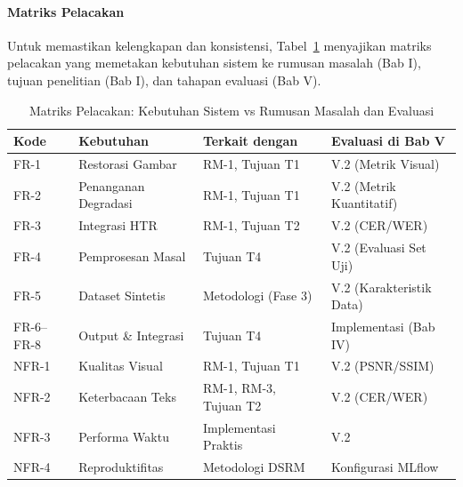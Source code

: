 \documentclass[12pt,a4paper]{article}
\begin{document}
\paragraph{Matriks Pelacakan}

Untuk memastikan kelengkapan dan konsistensi, Tabel~\ref{tab:traceability-matrix} menyajikan matriks pelacakan yang memetakan kebutuhan sistem ke rumusan masalah (Bab I), tujuan penelitian (Bab I), dan tahapan evaluasi (Bab V).

\begin{table}[htbp!]
\centering
\small
\caption{Matriks Pelacakan: Kebutuhan Sistem vs Rumusan Masalah dan Evaluasi}
\label{tab:traceability-matrix}
\begin{tabular}{p{}p{}p{}p{}}
\toprule
\textbf{Kode} & \textbf{Kebutuhan} & \textbf{Terkait dengan} & \textbf{Evaluasi di Bab V} \\
\midrule
FR-1 & Restorasi Gambar & RM-1, Tujuan T1 & V.2 (Metrik Visual) \\
\midrule
FR-2 & Penanganan Degradasi & RM-1, Tujuan T1 & V.2 (Metrik Kuantitatif) \\
\midrule
FR-3 & Integrasi HTR & RM-1, Tujuan T2 & V.2 (CER/WER) \\
\midrule
FR-4 & Pemprosesan Masal & Tujuan T4 & V.2 (Evaluasi Set Uji) \\
\midrule
FR-5 & Dataset Sintetis & Metodologi (Fase 3) & V.2 (Karakteristik Data) \\
\midrule
FR-6--FR-8 & Output \& Integrasi & Tujuan T4 & Implementasi (Bab IV) \\
\midrule
NFR-1 & Kualitas Visual & RM-1, Tujuan T1 & V.2 (PSNR/SSIM) \\
\midrule
NFR-2 & Keterbacaan Teks & RM-1, RM-3, Tujuan T2 & V.2 (CER/WER) \\
\midrule
NFR-3 & Performa Waktu & Implementasi Praktis & V.2\footnotemark[1] \\
\midrule
NFR-4 & Reproduktifitas & Metodologi DSRM & Konfigurasi MLflow \\
\bottomrule
\end{tabular}
\end{table}

\end{document}
